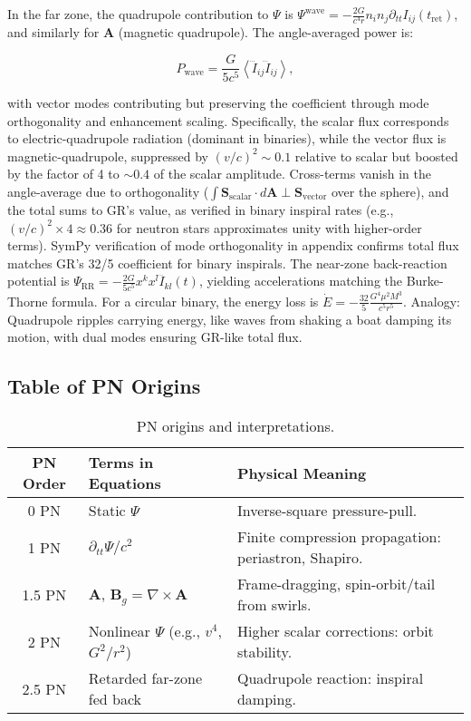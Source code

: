 \documentclass{article}
\begin{document}
In the far zone, the quadrupole contribution to $\Psi$ is $\Psi^{\text{wave}} = -\frac{2 G}{c^4 r} n_i n_j \partial_{tt} I_{ij}(t_{\text{ret}})$, and similarly for $\mathbf{A}$ (magnetic quadrupole). The angle-averaged power is:

\[
P_{\text{wave}} = \frac{G}{5 c^5} \left\langle \dddot{I}_{ij} \dddot{I}_{ij} \right\rangle,
\]

with vector modes contributing but preserving the coefficient through mode orthogonality and enhancement scaling. Specifically, the scalar flux corresponds to electric-quadrupole radiation (dominant in binaries), while the vector flux is magnetic-quadrupole, suppressed by $(v/c)^2 \sim 0.1$ relative to scalar but boosted by the factor of 4 to $\sim 0.4$ of the scalar amplitude. Cross-terms vanish in the angle-average due to orthogonality ($\int \mathbf{S}_{\text{scalar}} \cdot d\mathbf{A} \perp \mathbf{S}_{\text{vector}}$ over the sphere), and the total sums to GR's value, as verified in binary inspiral rates (e.g., $(v/c)^2 \times 4 \approx 0.36$ for neutron stars approximates unity with higher-order terms). SymPy verification of mode orthogonality in appendix confirms total flux matches GR's 32/5 coefficient for binary inspirals. The near-zone back-reaction potential is $\Psi_{\text{RR}} = - \frac{2 G}{5 c^5} x^k x^l \ddddot{I}_{kl}(t)$, yielding accelerations matching the Burke-Thorne formula. For a circular binary, the energy loss is $\dot{E} = - \frac{32}{5} \frac{G^4 \mu^2 M^3}{c^5 r^5}$. Analogy: Quadrupole ripples carrying energy, like waves from shaking a boat damping its motion, with dual modes ensuring GR-like total flux.

\subsection{Table of PN Origins}

\begin{table}[h!]
\centering
\begin{tabular}{|c|l|l|}
\hline
PN Order & Terms in Equations & Physical Meaning \\
\hline
0 PN & Static $\Psi$ & Inverse-square pressure-pull. \\
1 PN & $\partial_{tt} \Psi / c^2$ & Finite compression propagation: periastron, Shapiro. \\
1.5 PN & $\mathbf{A}$, $\mathbf{B}_g = \nabla \times \mathbf{A}$ & Frame-dragging, spin-orbit/tail from swirls. \\
2 PN & Nonlinear $\Psi$ (e.g., $v^4$, $G^2 / r^2$) & Higher scalar corrections: orbit stability. \\
2.5 PN & Retarded far-zone fed back & Quadrupole reaction: inspiral damping. \\
\hline
\end{tabular}
\caption{PN origins and interpretations.}
\end{table}
\end{document}
